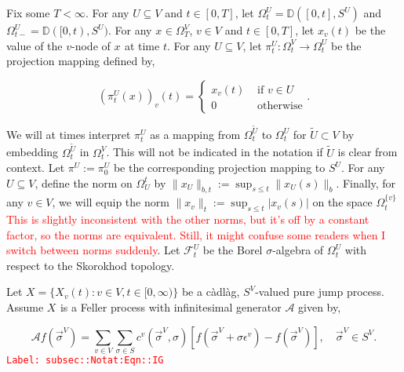 \documentclass[12pt]{article}
\newcommand{\mb}{\mathbb}
\newcommand{\mc}{\mathcal}
\newcommand{\ra}{\rightarrow}
\newcommand{\te}{\text}
\newcommand{\ep}{\epsilon}
\newcommand{\tr}{\textcolor{red}}
\newcommand{\labe}[1]{\tr{\texttt{Label: #1}}}
\newcommand{\ind}{\hspace{24pt}}
\newcommand{\defeq}{:=}								%
\newcommand{\cad}{\mb{D}}							%
\renewcommand{\v}{v}							%
\renewcommand{\U}{U}							%
\renewcommand{\S}{S}							%
\newcommand{\s}{\sigma}							%
\newcommand{\sv}{\vec{\s}}						%
\renewcommand{\b}{b}							%
\newcommand{\ev}{\ep}							%
\newcommand{\T}{T}								%
\newcommand{\x}{x}								%
\renewcommand{\t}{t}							%
\newcommand{\sset}{\Omega}						%
\newcommand{\proj}{\pi}							%
\renewcommand{\tt}{s}							%
\newcommand{\F}{\mc{F}}							%
\newcommand{\X}{X}								%
\newcommand{\IG}{\mc{A}}						%
\newcommand{\IGr}{c}							%
\newcommand{\vind}[1]{^{#1}}					%
\newcommand{\carp}[1]{^{#1}}					%
\newcommand{\vsi}[1]{^{#1}}						%
\newcommand{\cind}[1]{_{#1}}					%
\newcommand{\tp}[1]{(#1)}						%
\newcommand{\tip}[1]{#1}						%
\newcommand{\ts}[1]{_{#1}}						%
\newcommand{\alt}[1]{\widetilde{#1}}			%
\begin{document}
\ind Fix some \(\T < \infty\). For any \(\U\subseteq V\) and \(\t\in [0,\T]\), let \(\sset\vsi{\U}\ts{\t} = \cad([0,\t],\S\carp{\U})\) and \(\sset\vsi{\U}\ts{\t-} = \cad([0,\t),\S\carp{\U})\). For any \(\x\cind{}\tip{} \in \sset\vsi{V}\ts{\T}\), \(\v\in V\) and  \(\t \in [0,\T]\), let \(\x\cind{\v}\tp{\t}\) be the value of the \(\v\)-node of \(\x\cind{}\tip{}\) at time \(\t\). For any \(U\subseteq V\), let \(\proj\vsi{\U}\ts{\t}: \sset\vsi{V}\ts{\t} \ra \sset\vsi{\U}\ts{\t}\) be the projection mapping defined by,

\[\left(\proj\vsi{\U}\ts{\t}(\x)\right)\cind{\v}\tp{\t} = \begin{cases}
\x\cind{\v}\tp{\t} &\te{ if } \v \in \U\\
0 &\te{ otherwise}
\end{cases}.\]

We will at times interpret \(\proj\vsi{\U}\ts{\t}\) as a mapping from \(\sset\vsi{\alt{\U}}\ts{\t}\) to \(\sset\vsi{\U}\ts{\t}\) for \(\alt{\U}\subset V\) by embedding \(\sset\vsi{\alt{U}}\ts{\t}\) in \(\sset\vsi{V}\ts{\t}\). This will not be indicated in the notation if \(\alt{\U}\) is clear from context. Let \(\proj\vsi{\U}\ts{} \defeq \proj\vsi{\U}\ts{0}\) be the corresponding projection mapping to \(\S\carp{\U}\). For any \(\U\subseteq V\), define the norm on \(\sset\vsi{\t}\ts{\U}\) by \(\|\x\cind{\U}\tip{}\|_{\b,\t} \defeq \sup_{\tt \leq \t} \|\x\cind{\U}\tp{\tt}\|_{\b}\). Finally, for any \(\v\in V\), we will equip the norm \(\|\x\cind{\v}\|_\t \defeq \sup_{\tt\leq \t} |x\cind{\v}\tp{\tt}|\) on the space \(\sset\vsi{\{\v\}}\ts{\t}\) \tr{This is slightly inconsistent with the other norms, but it's off by a constant factor, so the norms are equivalent. Still, it might confuse some readers when I switch between norms suddenly}. Let \(\F\vsi{\U}\ts{\t}\) be the Borel \(\sigma\)-algebra of \(\sset\vsi{\U}\ts{\t}\) with respect to the Skorokhod topology. 

\ind Let \(\X = \{\X\cind{\v}\tp{\t}:\v\in V,\t\in [0,\infty)\}\) be a c\`adl\`ag, \(\S\carp{V}\)-valued pure jump process. Assume \(\X\cind{}\tip{}\) is a Feller process with infinitesimal generator \(\IG\) given by,

\begin{equation}
\IG f(\sv\cind{}\vsi{V}) = \sum_{\v \in V}\sum_{\s \in \S} \IGr\vind{\v}(\sv\cind{}\vsi{V},\s)[f(\sv\cind{}\vsi{V} + \s \ev\vind{\v}) - f(\sv\cind{}\vsi{V})], \quad \sv\vsi{V} \in \S\carp{V}.
\label{subsec::Notat:Eqn::IG}
\end{equation}
\labe{subsec::Notat:Eqn::IG}
\end{document}
